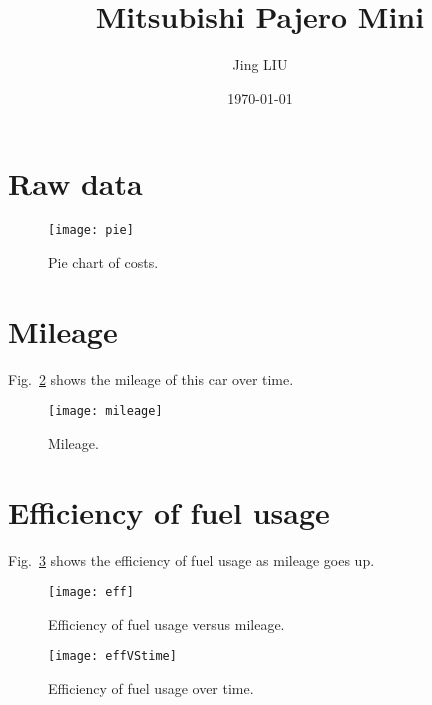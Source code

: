 \documentclass[12pt, a4paper]{article}
\title{Mitsubishi Pajero Mini}
\date{\today}
\author{Jing LIU}
\begin{document}
\maketitle

\begin{abstract}
\end{abstract}

\thispagestyle{empty}

\tableofcontents

\pagebreak \setcounter{page}{1} 


\section{Raw data}
\label{s:data}

\begin{center}
  
\end{center}

\begin{figure} [htbp]
  \centering
  \texttt{[image: pie]}
  \caption{Pie chart of costs.}
  \label{f:pie}
\end{figure}

\section{Mileage}
\label{s:mile}

Fig.~\ref{f:mile} shows the mileage of this car over time.

\begin{figure} [htbp]
  \centering
  \texttt{[image: mileage]}
  \caption{Mileage.}
  \label{f:mile}
\end{figure}

\section{Efficiency of fuel usage}
\label{s:eff}

Fig.~\ref{f:eff} shows the efficiency of fuel usage as mileage goes up.

\begin{figure} [htbp]
  \centering
  \texttt{[image: eff]}
  \caption{Efficiency of fuel usage versus mileage.}
  \label{f:eff}
\end{figure}

\begin{figure} [htbp]
  \centering
  \texttt{[image: effVStime]}
  \caption{Efficiency of fuel usage over time.}
  \label{f:cont}
\end{figure}
\end{document}
